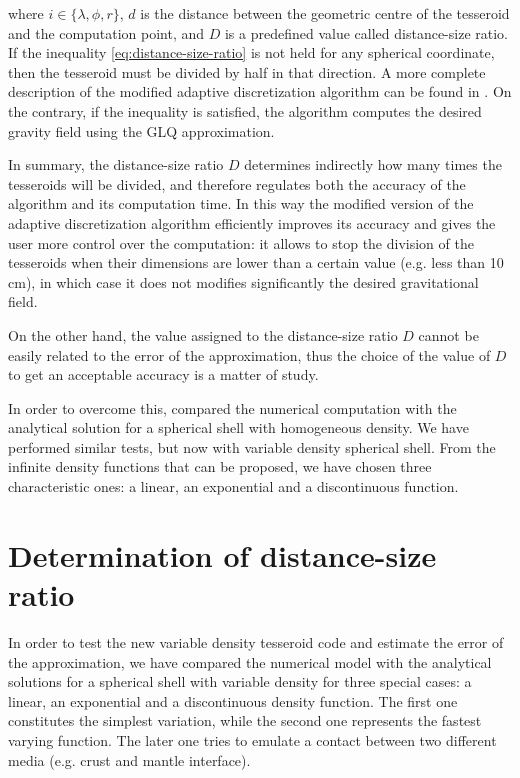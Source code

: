 \documentclass[extra]{gji}
\begin{document}
\noindent where $i \in \{\lambda, \phi, r\}$, $d$ is the distance between the geometric centre of the tesseroid and the computation point, and $D$ is a predefined value called distance-size ratio.
If the inequality \ref{eq:distance-size-ratio} is not held for any spherical coordinate, then the tesseroid must be divided by half in that direction.
A more complete description of the modified adaptive discretization algorithm can be found in \citet{Uieda2016}.
On the contrary, if the inequality is satisfied, the algorithm computes the desired gravity field using the GLQ approximation.

In summary, the distance-size ratio $D$ determines indirectly how many times the tesseroids will be divided, and therefore regulates both the accuracy of the algorithm and its computation time.
In this way the modified version of the adaptive discretization algorithm efficiently improves its accuracy and gives the user more control over the computation: it allows to stop the division of the tesseroids when their dimensions are lower than a certain value (e.g. less than 10 cm), in which case it does not modifies significantly the desired gravitational field.

On the other hand, the value assigned to the distance-size ratio $D$ cannot be easily related to the error of the approximation, thus the choice of the value of $D$ to get an acceptable accuracy is a matter of study.

In order to overcome this, \citet{Uieda2016} compared the numerical computation with the analytical solution for a spherical shell with homogeneous density.
We have performed similar tests, but now with variable density spherical shell.
From the infinite density functions that can be proposed, we have chosen three characteristic ones: a linear, an exponential and a discontinuous function.



\section{Determination of distance-size ratio}

In order to test the new variable density tesseroid code and estimate the error of the approximation, we have compared the numerical model with the analytical solutions for a spherical shell with variable density for three special cases: a linear, an exponential and a discontinuous density function.
The first one constitutes the simplest variation, while the second one represents the fastest varying function. The later one tries to emulate a contact between two different media (e.g. crust and mantle interface).
\end{document}
